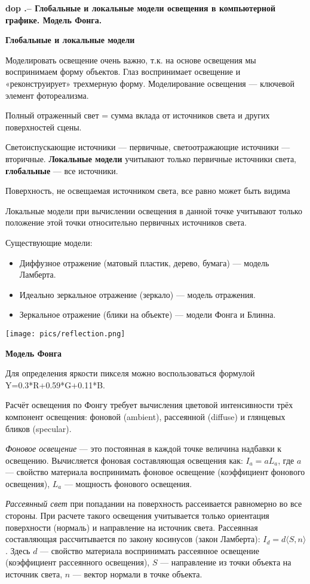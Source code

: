 \textbf{\LARGE dop .-- Глобальные и локальные модели освещения в компьютерной графике. Модель Фонга.}

\textbf{Глобальные и локальные модели}

Моделировать освещение очень важно, т.к. на основе освещения мы воспринимаем форму объектов. Глаз воспринимает освещение и «реконструирует» трехмерную форму. Моделирование освещения --- ключевой элемент фотореализма.

Полный отраженный свет = сумма вклада от источников света и других поверхностей сцены.

Светоиспускающие источники --- первичные, светоотражающие источники --- вторичные. 
\textbf{Локальные модели} учитывают только первичные источники
света, \textbf{глобальные} --- все источники. 

Поверхность, не освещаемая источником света, все равно может быть видима

Локальные модели при вычислении освещения в данной точке учитывают только положение этой точки относительно первичных источников света.

Существующие модели:
\begin{itemize}
    \item Диффузное отражение (матовый пластик, дерево, бумага) --- модель Ламберта. 
    \item Идеально зеркальное отражение (зеркало) --- модель отражения.
    \item Зеркальное отражение (блики на объекте) --- модели Фонга и Блинна.
\end{itemize}

\texttt{[image: pics/reflection.png]}

\textbf{Модель Фонга}

Для определения яркости пикселя можно воспользоваться формулой Y=0.3*R+0.59*G+0.11*B.

Расчёт освещения по Фонгу требует вычисления цветовой интенсивности трёх компонент освещения: фоновой (ambient), рассеянной (diffuse) и глянцевых бликов (specular).

\textit{Фоновое освещение} --- это постоянная в каждой точке величина надбавки к освещению. 
Вычисляется фоновая составляющая освещения как: $I_a = a L_a$, где $a$ --- свойство материала воспринимать фоновое освещение (коэффициент фонового освещения), $L_a$ --- мощность фонового освещения.

\textit{Рассеянный свет} при попадании на поверхность рассеивается равномерно во все стороны. 
При расчете такого освещения учитывается только ориентация поверхности (нормаль) и направление на источник света. 
Рассеянная составляющая рассчитывается по закону косинусов (закон Ламберта): $I_d = d \langle S, n \rangle$. 
Здесь $d$ --- свойство материала воспринимать рассеянное освещение (коэффициент рассеянного освещения), $S$ --- направление из точки объекта на источник света, $n$ --- вектор нормали в точке объекта.

